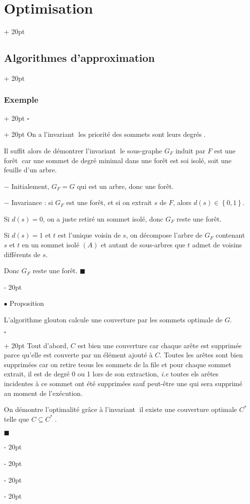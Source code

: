 \documentclass[a4paper, 12pt, twoside]{article}
\newcommand{\set}[1]{\left\{ #1 \right\}}
\newcommand{\simplecit}[1]{\guillemotleft$\;$#1$\;$\guillemotright}
\newcommand{\ind}[1][20pt]{\advance\leftskip + #1}
\newcommand{\deind}[1][20pt]{\advance\leftskip - #1}
\newenvironment{indt}[2][20pt]{#2 \par \ind[#1]}{\par \deind} %
\newenvironment{proof}[1][{}]{\begin{indt}{$\square$ #1}}{$\blacksquare$ \end{indt}}
\newcommand{\1}{\mathbbm 1}
\begin{document}
\begin{indt}{\section{Optimisation}}
\begin{indt}{\subsection{Algorithmes d'approximation}}
\begin{indt}{\subsubsection{Exemple}}
                \begin{proof}
                    On a l'invariant \simplecit{les priorité des sommets sont leurs degrés}.

                    Il suffit alors de démontrer l'invariant \simplecit{le sous-graphe $G_F$ induit par $F$ est une forêt} car une sommet de degré minimal dans une forêt est soi isolé, soit une feuille d'un arbre.

                    $-$ Initialement, $G_F = G$ qui est un arbre, donc une forêt.

                    $-$ Invariance : si $G_F$ est une forêt, et si on extrait $s$ de $F$,
                    alors $d(s) \in \set{0, 1}$.

                    Si $d(s) = 0$, on a juste retiré un sommet isolé, donc $G_F$ reste une forêt.

                    Si $d(s) = 1$ et $t$ est l'unique voisin de $s$, on décompose l'arbre de $G_F$ contenant $s$ et $t$ en un sommet isolé $(A)$ et autant de sous-arbres que $t$ admet de voisins différents de $s$.

                    Donc $G_F$ reste une forêt.
                \end{proof}

                \vspace{12pt}
                
                $\bullet$ Proposition
                \begin{emphBox}
                    L'algorithme glouton calcule une couverture par les sommets optimale de $G$.
                \end{emphBox}

                \vspace{6pt}
                
                \begin{proof}
                    Tout d'abord, $C$ est bien une couverture car chaque arête est supprimée parce qu'elle est couverte par un élément ajouté à $C$.
                    Toutes les arêtes sont bien supprimées car on retire teous les sommets de la file et pour chaque sommet extrait, il est de degré 0 ou 1 lors de son extraction, \textit{i.e} toutes els arêtes incidentes à ce sommet ont été supprimées sauf peut-être une qui sera supprimé au moment de l'exécution.

                    \vspace{12pt}
                    
                    On démontre l'optimalité grâce à l'invariant \simplecit{il existe une couverture optimale $C^*$ telle que $C \subseteq C^*$}.


\end{proof}
\end{indt}
\end{indt}
\end{indt}
\end{document}
